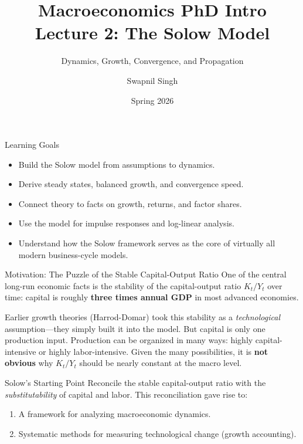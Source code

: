 \documentclass[aspectratio=169,10pt]{beamer}
\title{Macroeconomics PhD Intro\\Lecture 2: The Solow Model}
\subtitle{Dynamics, Growth, Convergence, and Propagation}
\author{Swapnil Singh}
\institute{Lietuvos Bankas \and Kaunas University of Technology}
\date{Spring 2026}
\begin{document}
\begin{frame}
  \titlepage
\end{frame}

\begin{frame}{Learning Goals}
\begin{itemize}
  \item Build the Solow model from assumptions to dynamics.
  \item Derive steady states, balanced growth, and convergence speed.
  \item Connect theory to facts on growth, returns, and factor shares.
  \item Use the model for impulse responses and log-linear analysis.
  \item Understand how the Solow framework serves as the core of virtually all modern business-cycle models.
\end{itemize}
\end{frame}


\begin{frame}{Motivation: The Puzzle of the Stable Capital-Output Ratio}
One of the central long-run economic facts is the stability of the capital-output ratio $K_t/Y_t$ over time: capital is roughly \textbf{three times annual GDP} in most advanced economies.

\medskip
Earlier growth theories (Harrod-Domar) took this stability as a \emph{technological} assumption---they simply built it into the model. But capital is only one production input. Production can be organized in many ways: highly capital-intensive or highly labor-intensive. Given the many possibilities, it is \textbf{not obvious} why $K_t/Y_t$ should be nearly constant at the macro level.

\medskip
\begin{block}{Solow's Starting Point}
Reconcile the stable capital-output ratio with the \emph{substitutability} of capital and labor. This reconciliation gave rise to:
\begin{enumerate}
  \item A framework for analyzing macroeconomic dynamics.
  \item Systematic methods for measuring technological change (growth accounting).
\end{enumerate}
\end{block}
\end{frame}
\end{document}
